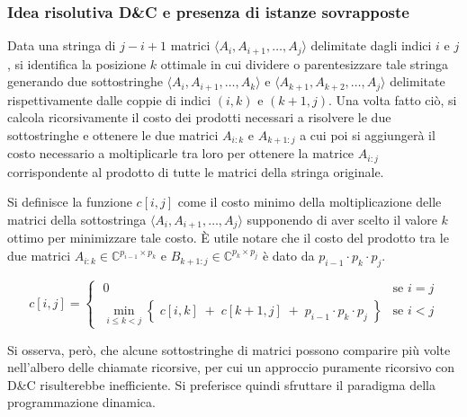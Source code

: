 \subsubsection*{Idea risolutiva D\&C e presenza di istanze sovrapposte}
Data una stringa di \(j-i+1\) matrici \(\langle A_i, A_{i+1}, \dots, A_j \rangle\) delimitate dagli indici \(i\) e \(j\),
si identifica la posizione \(k\) ottimale in cui dividere o parentesizzare tale stringa generando due sottostringhe
\(\langle A_i, A_{i+1}, \dots, A_k \rangle\) e \(\langle A_{k+1}, A_{k+2}, \dots, A_j \rangle\) delimitate rispettivamente dalle
coppie di indici \((i, k)\) e \((k+1, j)\). Una volta fatto ciò, si calcola ricorsivamente il costo dei prodotti
necessari a risolvere le due sottostringhe e ottenere le due matrici \(A_{i:k}\) e \(A_{k+1:j}\) a cui poi si aggiungerà
il costo necessario a moltiplicarle tra loro per ottenere la matrice \(A_{i:j}\) corrispondente al prodotto di tutte
le matrici della stringa originale.

Si definisce la funzione \(c[i, j]\) come il costo minimo della moltiplicazione delle matrici della sottostringa
\(\langle A_i, A_{i+1}, \dots, A_j \rangle\) supponendo di aver scelto il valore \(k\) ottimo per minimizzare tale costo.
È utile notare che il costo del prodotto tra le due matrici \(A_{i:k} \in \mathbb{C}^{p_{i-1} \times p_k}\) e
\(B_{k+1:j} \in \mathbb{C}^{p_k \times p_j}\) è dato da \(p_{i-1} \cdot p_k \cdot p_j\).

\[c[i, j] = \begin{cases}
	\; 0 & \text{se } i = j \\
	\; \displaystyle \min_{i \leq k < j} \left\{ \; c[i, k] \; + \; c[k+1, j] \; + \; p_{i-1} \cdot p_k \cdot p_j \; \right\} & \text{se } i < j
\end{cases} \]

\noindent
Si osserva, però, che alcune sottostringhe di matrici possono comparire più volte nell'albero delle chiamate ricorsive,
per cui un approccio puramente ricorsivo con D\&C risulterebbe inefficiente. Si preferisce quindi sfruttare il paradigma
della programmazione dinamica.

